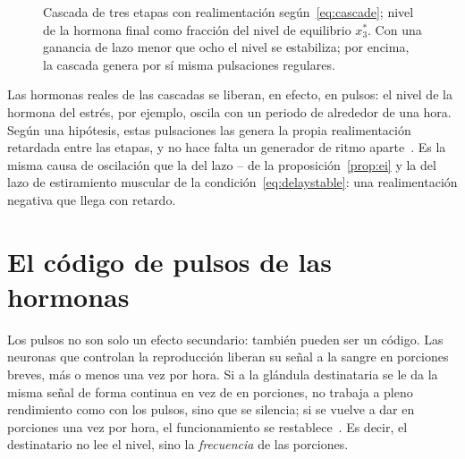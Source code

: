 \begin{figure}[t]
\centering
{}
\caption{Cascada de tres etapas con realimentación según~\eqref{eq:cascade}; nivel de la hormona final como fracción del nivel de equilibrio $x_3^*$. Con una ganancia de lazo menor que ocho el nivel se estabiliza; por encima, la cascada genera por sí misma pulsaciones regulares.}
\label{fig:cascade}
\end{figure}

Las hormonas reales de las cascadas se liberan, en efecto, en pulsos: el nivel de la hormona del estrés, por ejemplo, oscila con un periodo de alrededor de una hora. Según una hipótesis, estas pulsaciones las genera la propia realimentación retardada entre las etapas, y no hace falta un generador de ritmo aparte~\cite{Walker2010}. Es la misma causa de oscilación que la del lazo -- de la proposición~\ref{prop:ei} y la del lazo de estiramiento muscular de la condición~\eqref{eq:delaystable}: una realimentación negativa que llega con retardo.

\section{El código de pulsos de las hormonas}

Los pulsos no son solo un efecto secundario: también pueden ser un código. Las neuronas que controlan la reproducción liberan su señal a la sangre en porciones breves, más o menos una vez por hora. Si a la glándula destinataria se le da la misma señal de forma continua en vez de en porciones, no trabaja a pleno rendimiento como con los pulsos, sino que se silencia; si se vuelve a dar en porciones una vez por hora, el funcionamiento se restablece~\cite{Belchetz1978}. Es decir, el destinatario no lee el nivel, sino la \emph{frecuencia} de las porciones.

